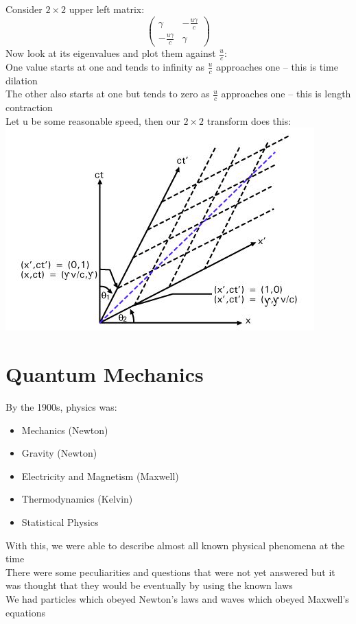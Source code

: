 \documentclass[a4paper, 11pt, fleqn, normalem]{report}
\begin{document}
Consider $2\times2$ upper left matrix:
\begin{equation*}
    \begin{pmatrix}
        \gamma             & -\frac{u\gamma}{c} \\
        -\frac{u\gamma}{c} & \gamma
    \end{pmatrix}
\end{equation*}
Now look at its eigenvalues and plot them against $\frac{u}{c}$: \\
One value starts at one and tends to infinity as $\frac{u}{c}$ approaches one -- this is time dilation \\
The other also starts at one but tends to zero as $\frac{u}{c}$ approaches one -- this is length contraction \\
Let u be some reasonable speed, then our $2\times2$ transform does this:\\
\includegraphics{Lorentz.jpg}

\chapter{Quantum Mechanics}
By the 1900s, physics was:
\begin{itemize}
    \item Mechanics (Newton)
    \item Gravity (Newton)
    \item Electricity and Magnetism (Maxwell)
    \item Thermodynamics (Kelvin)
    \item Statistical Physics
\end{itemize}
With this, we were able to describe almost all known physical phenomena at the time \\
There were some peculiarities and questions that were not yet answered but it was thought that they would be eventually by using the known laws\\
We had particles which obeyed Newton's laws and waves which obeyed Maxwell's equations
\end{document}
